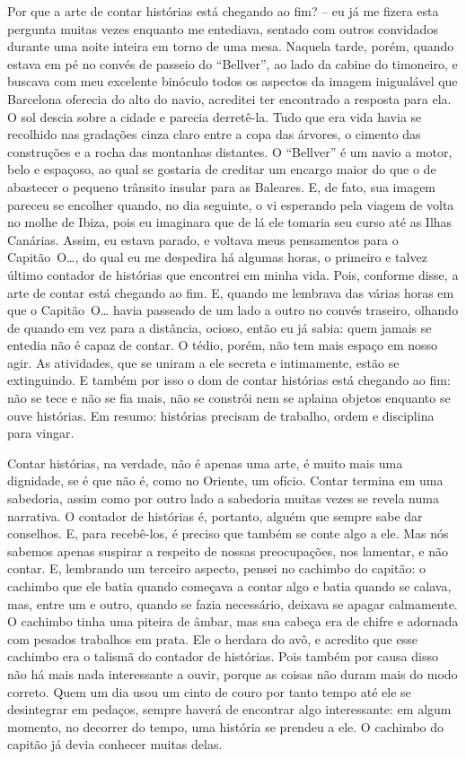 Por que a arte de contar histórias está chegando ao fim? -- eu já me
fizera esta pergunta muitas vezes enquanto me entediava, sentado com
outros convidados durante uma noite inteira em torno de uma mesa.
Naquela tarde, porém, quando estava em pé no convés de passeio do
``Bellver'', ao lado da cabine do timoneiro, e buscava com meu excelente
binóculo todos os aspectos da imagem inigualável que Barcelona oferecia
do alto do navio, acreditei ter encontrado a resposta para ela. O sol
descia sobre a cidade e parecia derretê-la. Tudo que era vida havia se
recolhido nas gradações cinza claro entre a copa das árvores, o cimento
das construções e a rocha das montanhas distantes. O ``Bellver'' é um
navio a motor, belo e espaçoso, ao qual se gostaria de creditar um
encargo maior do que o de abastecer o pequeno trânsito insular para as
Baleares. E, de fato, sua imagem pareceu se encolher quando, no dia
seguinte, o vi esperando pela viagem de volta no molhe de Ibiza, pois eu
imaginara que de lá ele tomaria seu curso até as Ilhas Canárias. Assim,
eu estava parado, e voltava meus pensamentos para o Capitão~O\ldots{}, do
qual eu me despedira há algumas horas, o primeiro e talvez último
contador de histórias que encontrei em minha vida. Pois, conforme disse,
a arte de contar está chegando ao fim. E, quando me lembrava das várias
horas em que o Capitão~O\ldots{} havia passeado de um lado a outro no convés
traseiro, olhando de quando em vez para a distância, ocioso, então eu já
sabia: quem jamais se entedia não é capaz de contar. O tédio, porém, não
tem mais espaço em nosso agir. As atividades, que se uniram a ele
secreta e intimamente, estão se extinguindo. E também por isso o dom de
contar histórias está chegando ao fim: não se tece e não se fia mais,
não se constrói nem se aplaina objetos enquanto se ouve histórias. Em
resumo: histórias precisam de trabalho, ordem e disciplina para vingar.

Contar histórias, na verdade, não é apenas uma arte, é muito mais uma
dignidade, se é que não é, como no Oriente, um ofício. Contar termina em
uma sabedoria, assim como por outro lado a sabedoria muitas vezes se
revela numa narrativa. O contador de histórias é, portanto, alguém que
sempre sabe dar conselhos. E, para recebê-los, é preciso que também se
conte algo a ele. Mas nós sabemos apenas suspirar a respeito de nossas
preocupações, nos lamentar, e não contar. E, lembrando um terceiro
aspecto, pensei no cachimbo do capitão: o cachimbo que ele batia quando
começava a contar algo e batia quando se calava, mas, entre um e outro,
quando se fazia necessário, deixava se apagar calmamente. O cachimbo
tinha uma piteira de âmbar, mas sua cabeça era de chifre e adornada com
pesados trabalhos em prata. Ele o herdara do avô, e acredito que esse
cachimbo era o talismã do contador de histórias. Pois também por causa
disso não há mais nada interessante a ouvir, porque as coisas não duram
mais do modo correto. Quem um dia usou um cinto de couro por tanto tempo
até ele se desintegrar em pedaços, sempre haverá de encontrar algo
interessante: em algum momento, no decorrer do tempo, uma história se
prendeu a ele. O cachimbo do capitão já devia conhecer muitas delas.


